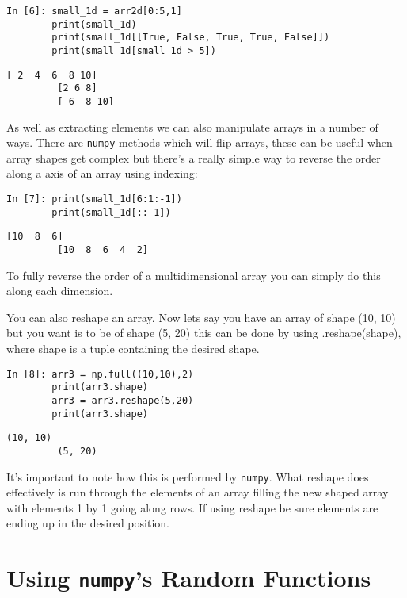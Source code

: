 \begin{lstlisting}[style=PY]
In [6]: small_1d = arr2d[0:5,1]
        print(small_1d)
        print(small_1d[[True, False, True, True, False]])
        print(small_1d[small_1d > 5])
\end{lstlisting}
\begin{lstlisting}[style=PY, backgroundcolor=\color{white}]
         [ 2  4  6  8 10]
         [2 6 8]
         [ 6  8 10]
\end{lstlisting}

As well as extracting elements we can also manipulate arrays in a number of ways. There are \texttt{numpy} methods which will flip arrays, these can be useful when array shapes get complex but there's a really simple way to reverse the order along a axis of an array using indexing:

\begin{lstlisting}[style=PY]
In [7]: print(small_1d[6:1:-1])
        print(small_1d[::-1])
\end{lstlisting}
\begin{lstlisting}[style=PY, backgroundcolor=\color{white}]
         [10  8  6]
         [10  8  6  4  2]
\end{lstlisting}

To fully reverse the order of a multidimensional array you can simply do this along each dimension.

\newpage
You can also reshape an array. Now lets say you have an array of shape (10, 10) but you want is to be of shape (5, 20) this can be done by using .reshape(shape), where shape is a tuple containing the desired shape. 

\begin{lstlisting}[style=PY]
In [8]: arr3 = np.full((10,10),2)
        print(arr3.shape)
        arr3 = arr3.reshape(5,20)
        print(arr3.shape)
\end{lstlisting}
\begin{lstlisting}[style=PY, backgroundcolor=\color{white}]
         (10, 10)
         (5, 20)
\end{lstlisting}

It's important to note how this is performed by \texttt{numpy}. What reshape does effectively is run through the elements of an array filling the new shaped array with elements 1 by 1 going along rows. If using reshape be sure elements are ending up in the desired position.

\section{Using \texttt{numpy}'s Random Functions}
\label{sec:numpyrandom}

